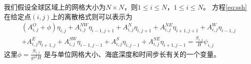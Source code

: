 我们假设全球区域上的网格大小为$N\times N$，则$1\le i\le N$，$1\le i\le N$。  
方程\ref{eq:ssh}在给定点$(i,j)$上的离散格式则可以表示为  
\begin{align}
\label{eq:sten}
&(A_{i,j}^O+\phi ) \eta_{i,j}+A_{i,j}^{NW}\eta_{i-1,j+1}+A_{i,j}^N\eta_{i,j+1} +A_{i,j}^{NE}\eta_{i+1,j+1}+A_{i,j}^W\eta_{i-1,j}  \nonumber\\
& +A_{i,j}^E\eta_{i+1,j} +A_{i,j}^{SW}\eta_{i-1,j-1} +A_{i,j}^S\eta_{i,j-1}+ A_{i,j }^{SE}\eta_{i+1,j-1}= \frac{S_{i,j}}{H}\psi_{i,j}
\end{align}
这里$\phi = \frac{S_{i,j}}{g  \tau^2H}$ 是与单位网格大小、海底深度和时间步长有关的一个变量。

